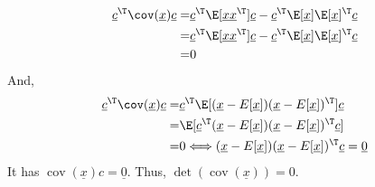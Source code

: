 \documentclass[a4paper]{article}
\begin{document}
\begin{enumerate}
\begin{enumerate}
\begin{enumerate}
        \begin{equation*}
            \begin{align*}
        \underline{c}^\T \cov(\underline{x})\underline{c} = & \underline{c}^\T\E[\underline{x}\underline{x}^\T]\underline{c}-\underline{c}^\T\E[\underline{x}]\E[\underline{x}]^\T\underline{c}\\
        = & \underline{c}^\T\E[\underline{x}\underline{x}^\T]\underline{c}-\underline{c}^\T\E[\underline{x}]\E[\underline{x}]^\T\underline{c}\\
        = & 0
        \end{align*}
        \end{equation*}
        And,
        \begin{equation*}
            \begin{align*}
        \underline{c}^\T \cov(\underline{x})\underline{c} = & \underline{c}^\T\E[(\underline{x}-E[\underline{x}])(\underline{x}-E[\underline{x}])^\T]\underline{c}\\
        =&\E[\underline{c}^\T(\underline{x}-E[\underline{x}])(\underline{x}-E[\underline{x}])^\T\underline{c}]\\
        = & 0 \Longleftrightarrow (\underline{x}-E[\underline{x}])(\underline{x}-E[\underline{x}])^\T\underline{c} = \underline{0}
        \end{align*}
        \end{equation*}
        It has $\operatorname{cov}(\underline{x})c=\underline{0}$. 
        Thus, $\operatorname{det}(\operatorname{cov}(\underline{x}))=0$.
        
    \end{enumerate}
  

\end{enumerate}
\end{enumerate}
\end{document}
